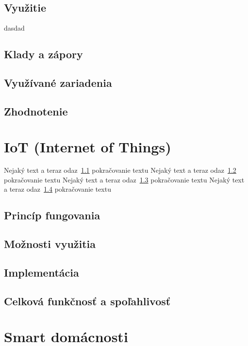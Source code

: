 \documentclass[10pt,twoside,slovak,a4paper]{article}
\begin{document}
\subsection{Využitie}\label{domacnosti:využitie}
dasdad
\subsection{Klady a zápory}\label{domacnosti:plusy}

\subsection{Využívané zariadenia}\label{domacnosti:zariadenia}

\subsection{Zhodnotenie}\label{domacnosti:zhodnotenie}


\section{IoT (Internet of Things)}\label{IoT}
Nejaký text a teraz odaz~\ref{IoT:princíp} pokračovanie textu
Nejaký text a teraz odaz~\ref{IoT:využitie} pokračovanie textu
Nejaký text a teraz odaz~\ref{IoT:implementácia} pokračovanie textu
Nejaký text a teraz odaz~\ref{IoTi:funkčnosť} pokračovanie textu

\subsection{Princíp fungovania}\label{IoT:princíp}

\subsection{Možnosti využitia}\label{IoT:využitie}

\subsection{Implementácia}\label{IoT:implementácia}

\subsection{Celková funkčnosť a spoľahlivosť}\label{IoTi:funkčnosť}


\section{Smart domácnosti}\label{zabezpečenie}
\end{document}
